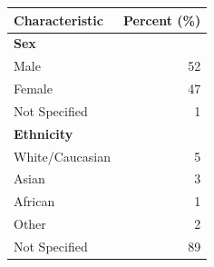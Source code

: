 \vspace{0.5em}
\centering
\begin{tabular}{l r}
\toprule
\textbf{Characteristic} & \textbf{Percent (\%)} \\
\midrule
\multicolumn{2}{l}{\textbf{Sex}} \\
\quad Male & 52 \\
\quad Female & 47 \\
\quad Not Specified & 1 \\
\midrule
\multicolumn{2}{l}{\textbf{Ethnicity}} \\
\quad White/Caucasian & 5 \\
\quad Asian & 3 \\
\quad African & 1 \\
\quad Other & 2 \\
\quad Not Specified & 89 \\
\bottomrule
\end{tabular}
